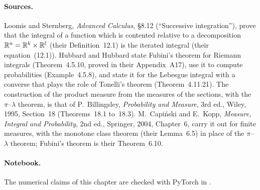 \begin{notechapter}
\paragraph{Sources.} Loomis and Sternberg, \emph{Advanced Calculus},
\S8.12 (``Successive integration''), prove that the integral of a
function which is contented relative to a decomposition
$\mathbb{R}^n = \mathbb{R}^k\times\mathbb{R}^l$ (their Definition~12.1) is the iterated integral
(their equation~(12.1)). Hubbard and
Hubbard state Fubini's theorem for Riemann integrals (Theorem~4.5.10,
proved in their Appendix~A17), use it to compute probabilities
(Example~4.5.8), and state it for the Lebesgue integral with a converse
that plays the role of Tonelli's theorem (Theorem~4.11.21). The
construction of the product measure from the measures of the
sections, with the $\pi$--$\lambda$ theorem, is that of P.~Billingsley,
\emph{Probability and Measure}, 3rd ed., Wiley, 1995, Section~18
(Theorems~18.1 to~18.3). M.~Capi\'nski and E.~Kopp, \emph{Measure,
Integral and Probability}, 2nd ed., Springer, 2004, Chapter~6, carry
it out for finite measures, with the monotone class theorem (their
Lemma~6.5) in place of the $\pi$--$\lambda$ theorem; Fubini's theorem
is their Theorem~6.10.

\paragraph{Notebook.} The numerical claims of this chapter are checked
with PyTorch in .


\end{notechapter}
